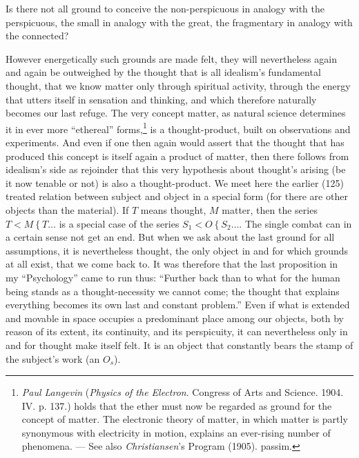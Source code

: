 \documentclass[12pt,a4paper]{book}
\newcommand{\opage}[1]{\marginnote{\footnotesize\textit{[#1]}}}
\begin{document}
Is there not all ground to conceive the non-perspicuous in analogy with the perspicuous, the small
in analogy with the great, the fragmentary in analogy with the connected?

However energetically such grounds are made felt, they will nevertheless again and again be
outweighed by the thought that is all idealism's fundamental thought, that we know matter only
through spiritual activity, through the energy that utters itself in sensation and thinking, and
which therefore naturally becomes our last refuge. The very concept matter, as natural science
determines it in ever more ``ethereal'' forms,\footnote{\emph{Paul Langevin} (\emph{Physics of the
Electron}. Congress of Arts and Science. 1904. IV. p. 137.) holds that the ether must now be
regarded as ground for the concept of matter. The electronic theory of matter, in which matter is
partly synonymous with electricity in motion, explains an ever-rising number of phenomena. --- See
also \emph{Christiansen}'s Program (1905). passim.} \opage{332}is a thought-product, built on observations and
experiments. And even if one then again would assert that the thought that has produced this
concept is itself again a product of matter, then there follows from idealism's side as rejoinder
that this very hypothesis about thought's arising (be it now tenable or not) is also a
thought-product. We meet here the earlier (125) treated relation between subject and object in a
special form (for there are other objects than the material). If $T$ means thought, $M$ matter,
then the series $T < M \mathrel{\{} T \ldots$ is a special case of the series $S_1 < O \mathrel{\{}
S_2 \ldots$. The single combat can in a certain sense not get an end. But when we ask about the
last ground for all assumptions, it is nevertheless thought, the only object in and for which
grounds at all exist, that we come back to. It was therefore that the last proposition in my
``Psychology'' came to run thus: ``Further back than to what for the human being stands as a
thought-necessity we cannot come; the thought that explains everything becomes its own last and constant problem.'' Even if what is extended and movable in space occupies a predominant place
among our objects, both by reason of its extent, its continuity, and its perspicuity, it can
nevertheless only in and for thought make itself felt. It is an object that constantly bears the
stamp of the subject's work (an $O_s$).
\end{document}
